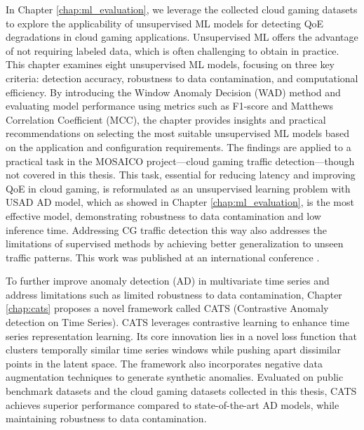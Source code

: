 In Chapter \ref{chap:ml_evaluation}, we leverage the collected cloud gaming datasets to explore the applicability of unsupervised ML models for detecting QoE degradations in cloud gaming applications. Unsupervised ML offers the advantage of not requiring labeled data, which is often challenging to obtain in practice. This chapter examines eight unsupervised ML models, focusing on three key criteria: detection accuracy, robustness to data contamination, and computational efficiency. By introducing the Window Anomaly Decision (WAD) method and evaluating model performance using metrics such as F1-score and Matthews Correlation Coefficient (MCC), the chapter provides insights and practical recommendations on selecting the most suitable unsupervised ML models based on the application and configuration requirements. The findings are applied to a practical task in the MOSAICO project—cloud gaming traffic detection—though not covered in this thesis. This task, essential for reducing latency and improving QoE in cloud gaming, is reformulated as an unsupervised learning problem with USAD \ac{AD} model, which as showed in Chapter \ref{chap:ml_evaluation}, is the most effective model, demonstrating robustness to data contamination and low inference time. Addressing CG traffic detection this way also addresses the limitations of supervised methods by achieving better generalization to unseen traffic patterns. This work was published at an international conference \cite{ky2023hybrid}.


To further improve anomaly detection (AD) in multivariate time series and address limitations such as limited robustness to data contamination, Chapter \ref{chap:cats} proposes a novel framework called CATS (Contrastive Anomaly detection on Time Series). CATS leverages contrastive learning to enhance time series representation learning. Its core innovation lies in a novel loss function that clusters temporally similar time series windows while pushing apart dissimilar points in the latent space. The framework also incorporates negative data augmentation techniques to generate synthetic anomalies. Evaluated on public benchmark datasets and the cloud gaming datasets collected in this thesis, CATS achieves superior performance compared to state-of-the-art AD models, while maintaining robustness to data contamination.

